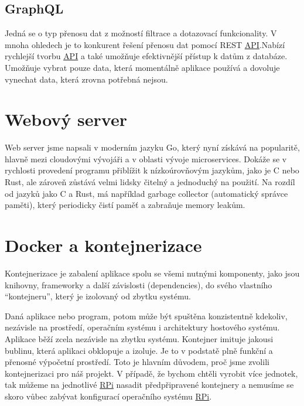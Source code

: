 \documentclass[czech,12pt,a4paper]{article}
\begin{document}
\subsection{GraphQL} \label{secGraphQL}

Jedná se o typ přenosu dat z možností filtrace a dotazovací funkcionality. V mnoha ohledech je to konkurent řešení přenosu dat pomocí \ac{REST} \space \underline{\ac{API}}.\@ Nabízí rychlejší tvorbu \underline{\ac{API}} \space a také umožňuje efektivnější přístup k datům z databáze. Umožňuje vybrat pouze data, která momentálně aplikace používá a dovoluje vynechat data, která zrovna potřebná nejsou.

\clearpage

\section{Webový server} \label{secWebServer}

Web server jsme napsali v moderním jazyku Go, který nyní získává na popularitě, hlavně mezi cloudovými vývojáři a v oblasti vývoje microservices. Dokáže se v rychlosti provedení programu přiblížit k nízkoúrovňovým jazykům, jako je C nebo Rust, ale zároveň zůstává velmi lidsky čitelný a jednoduchý na použití. Na rozdíl od jazyků jako C a Rust, má například garbage collector (automatický správce paměti), který periodicky čistí paměť a zabraňuje memory leakům.

\clearpage

\section{Docker a kontejnerizace} \label{secDocker}

Kontejnerizace je zabalení aplikace spolu se všemi nutnými komponenty, jako jsou knihovny, frameworky a další závislosti (dependencies), do svého vlastního \enquote{kontejneru}, který je izolovaný od zbytku systému.

Daná aplikace nebo program, potom může být spuštěna konzistentně kdekoliv, nezávisle na prostředí, operačním systému i architektury hostového systému. Aplikace běží zcela nezávisle na zbytku systému. Kontejner imituje jakousi bublinu, která aplikaci obklopuje a izoluje. Je to v podstatě plně funkční a přenosné výpočetní prostředí. Toto je hlavním důvodem, proč jsme zvolili kontejnerizaci pro náš projekt. V případě, že bychom chtěli vyrobit více jednotek, tak můžeme na jednotlivé \underline{\ac{RPi}} nasadit předpřipravené kontejnery a nemusíme se skoro vůbec zabývat konfigurací operačního systému \underline{\ac{RPi}}.
\end{document}
